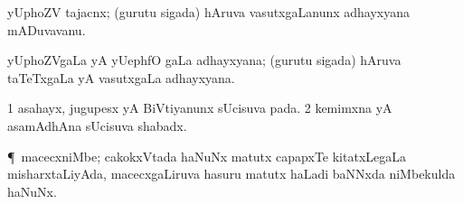 \bentry
{} 
\gl{\nA}
\expl{}
\bmng
yUphoZV tajacnx; (gurutu sigada) hAruva vasutxgaLanunx adhayxyana mADuvavanu. 
\emng
\eentry

\bentry
{} 
\gl{\nA}
\expl{}
\bmng
yUphoZVgaLa yA yUephfO  gaLa adhayxyana; (gurutu sigada) hAruva taTeTxgaLa yA vasutxgaLa adhayxyana. 
\emng
\eentry

\bentry
{} 
\gl{\BAavayx}
\bmng
\bnum
\num{1} asahayx, jugupesx yA BiVtiyanunx sUcisuva pada. 
\num{2} kemimxna yA asamAdhAna sUcisuva shabadx. 
\enum
\emng
\eentry

\bentry
{} 
\gl{\nA}
\bmng
\P\ macecxniMbe; cakokxVtada haNuNx matutx capapxTe kitatxLegaLa misharxtaLiyAda, macecxgaLiruva hasuru matutx haLadi baNNxda niMbekulda haNuNx. 
\emng
\eentry

